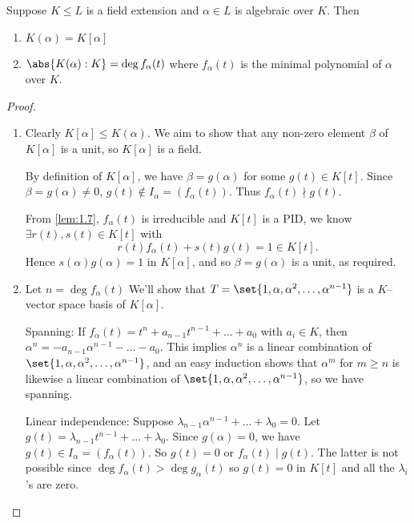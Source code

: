 \documentclass{article}
\begin{document}

\begin{nthm}\label{thm:1.9}
    Suppose $K \leq L$ is a field extension and $\alpha \in L$ is algebraic over $K$.  Then
    \begin{enumerate}[label=(\roman*)]
        \item  $K(\alpha) = K[\alpha]$
        \item $\abs{K(\alpha) : K} = \deg f_\alpha(t)$ where $f_\alpha(t)$ is the minimal polynomial of $\alpha$ over $K$.
    \end{enumerate}
\end{nthm}
\begin{proof}\leavevmode
    \begin{enumerate}[label=(\roman*)]
        \item Clearly $K[\alpha] \leq K(\alpha)$. We aim to show that any non-zero element $\beta$ of $K[\alpha]$ is a unit, so $K[\alpha]$ is a field.

            By definition of $K[\alpha]$, we have $\beta = g(\alpha)$ for some $g(t) \in K[t]$.
            Since $\beta = g(\alpha) \neq 0$, $g(t) \notin I_\alpha = (f_\alpha(t))$.
            Thus $f_\alpha(t) \nmid g(t)$.

            From \cref{lem:1.7}, $f_\alpha(t)$ is irreducible and $K[t]$ is a PID, we know $\exists r(t), s(t) \in K[t]$ with
            \begin{equation*}r(t) f_\alpha(t) + s(t) g(t) = 1 \in K[t].\end{equation*}
            Hence $s(\alpha) g(\alpha) = 1$ in $K[\alpha]$, and so $\beta = g(\alpha)$ is a unit, as required.
        \item Let $n = \deg f_\alpha(t)$ We'll show that $T = \set{1, \alpha, \alpha^2, \dotsc, \alpha^{n-1}}$ is a $K$--vector space basis of $K[\alpha]$.

            Spanning: If $f_\alpha(t) = t^n + a_{n-1} t^{n-1} + \dots + a_0$ with $a_i \in K$, then $\alpha^n = -a_{n-1} \alpha^{n-1} - \dots - a_0$.
            This implies $\alpha^n$ is a linear combination of $\set{1, \alpha, \alpha^2, \dotsc, \alpha^{n-1}}$, and an easy induction shows that $\alpha^m$ for $m \geq n$ is likewise a linear combination of $\set{1, \alpha, \alpha^2, \dotsc, \alpha^{n-1}}$, so we have spanning.

            Linear independence: Suppose $\lambda_{n-1} \alpha^{n-1} + \dotsc + \lambda_0 = 0$.
            Let $g(t) = \lambda_{n-1} t^{n-1} + \dotsc + \lambda_0$.  Since $g(\alpha) = 0$, we have $g(t) \in I_\alpha = (f_\alpha(t)).$  So $g(t) = 0$ or $f_\alpha(t) \mid g(t)$.
            The latter is not possible since $\deg f_\alpha(t) > \deg g_\alpha(t)$ so $g(t) = 0$ in $K[t]$ and all the $\lambda_i$'s are zero. \qedhere
    \end{enumerate}
\end{proof}
\end{document}
